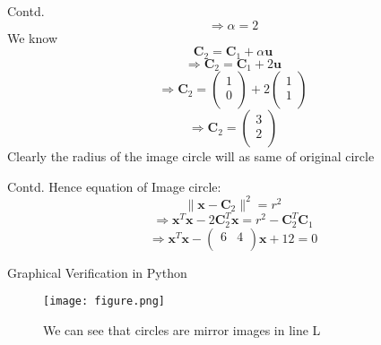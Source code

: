 \documentclass[10pt]{beamer}
\begin{document}
\begin{frame}[fragile]{Contd.}
\[\Rightarrow \alpha = 2
\]
We know
\[ \textbf{C}_2=\textbf{C}_1 + \alpha \textbf{u} 
\]
\[\Rightarrow \textbf{C}_2 = \textbf{C}_1 + 2\textbf{u}
\]
\[\Rightarrow \textbf{C}_2 =\left( {\begin{array}{c}
   1  \\
   0 \\
  \end{array} } \right)  + 2\left( {\begin{array}{c}
   1  \\
   1 \\
  \end{array} } \right)
\]
\[\Rightarrow \textbf{C}_2 =  \left( {\begin{array}{c}
   3  \\
   2 \\
  \end{array} } \right) 
\]
Clearly the radius of the image circle will as same of original circle


\end{frame}

\begin{frame}{Contd.}
Hence equation of Image circle:
\[ \|\textbf{x}-\textbf{C}_2\|^2 = r^2
\]
\[ \Rightarrow
  \textbf{x}^{T}\textbf{x}-2\textbf{C}_2^{T}\textbf{x}=r^2-\textbf{C}_2^{T}\textbf{C}_1
\]
\[\Rightarrow 
\textbf{x}^{T}\textbf{x} - \left( {\begin{array}{cc}
   6 & 4 \\
  \end{array} } \right)\textbf{x} + 12 = 0 
\]
 
\end{frame}

\begin{frame}{Graphical Verification in Python}
\begin{figure}[t]
\texttt{[image: figure.png]}
\caption{We can see that circles are mirror images in line L}
\end{figure}
\end{frame}
\end{document}
